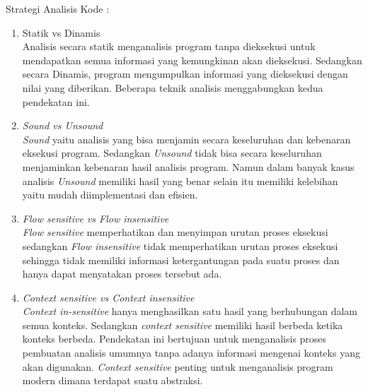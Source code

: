 Strategi Analisis Kode \cite{9}:
\begin{enumerate}[leftmargin=1.3cm]
	\item Statik vs Dinamis\\
	Analisis secara statik menganalisis program tanpa dieksekusi untuk mendapatkan semua informasi yang kemungkinan akan dieksekusi. Sedangkan secara Dinamis, program mengumpulkan informasi yang dieksekusi dengan nilai yang diberikan. Beberapa teknik analisis menggabungkan kedua pendekatan ini.
	\item \textit{Sound vs Unsound}\\
	\textit{Sound} yaitu analisis yang bisa menjamin secara keseluruhan dan kebenaran eksekusi program. Sedangkan \textit{Unsound} tidak bisa secara keseluruhan menjaminkan kebenaran hasil analisis program. Namun dalam banyak kasus analisis \textit{Unsound} memiliki hasil yang benar selain itu memiliki kelebihan yaitu mudah diimplementasi dan efisien.
	\item \textit{Flow sensitive vs Flow insensitive}\\
	\textit{Flow sensitive} memperhatikan dan menyimpan urutan proses eksekusi sedangkan \textit{Flow insensitive} tidak memperhatikan urutan proses eksekusi sehingga tidak memiliki informasi ketergantungan pada suatu proses dan hanya dapat menyatakan proses tersebut ada.
	\item \textit{Context sensitive vs Context insensitive}\\
	\textit{Context in-sensitive} hanya menghasilkan satu hasil yang berhubungan dalam semua konteks. Sedangkan \textit{context sensitive} memiliki hasil berbeda ketika konteks berbeda. Pendekatan ini bertujuan untuk menganalisis proses pembuatan analisis umumnya tanpa adanya informasi mengenai konteks yang akan digunakan. \textit{Context sensitive} penting untuk menganalisis program modern dimana terdapat suatu abstraksi.
\end{enumerate}

